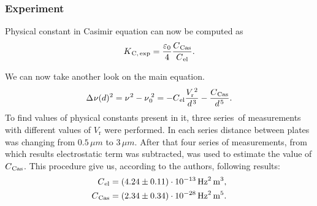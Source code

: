 \documentclass[10pt,t]{beamer}
\begin{document}
\begin{frame}
  \frametitle{Experiment}


  Physical constant in Casimir equation can now be computed as
  \begin{equation}
    \label{eq:G-Bressi-et-al-ETC-04}
    K_{ \HorSpaceTwo \text{C}, \, \text{exp} } =
    \frac{ \varepsilon_{ 0 } }{ 4 } \frac{ C_{ \HorSpaceTwo \text{Cas} } }{
      C_{ \HorSpaceTwo \text{el} } }.
  \end{equation}

  \vspace{-1em}



  We can now take another look on the main equation.
  \begin{equation}
    \label{eq:G-Bressi-et-al-ETC-05}
    \Delta \HorSpaceOne \nu( d )^{ 2 } =
    \nu^{ \HorSpaceOne 2 } - \nu_{ \HorSpaceTwo 0 }^{ \; 2 } =
    -C_{ \HorSpaceTwo \text{el} } \frac{ V_{ \text{r} }^{ \, 2 } }{
      d^{ \HorSpaceThree 3 } } -
    \frac{ C_{ \HorSpaceTwo \text{Cas} } }{ d^{ \HorSpaceFour 5 } }.
  \end{equation}
  To find values of physical constants present in it, three series~of
  measurements with different values of $V_{ \text{r} }$ were performed.
  In each series distance between plates was changing from
  $0.5 \, \mu\si{m}$ to $3 \, \mu\si{m}$. After that four series of
  measurements, from which results electrostatic term was subtracted, was
  used to estimate the value of $C_{ \hspace{0.07em} \text{Cas} }$. This procedure
  give us, according to the authors, following results:
  \begin{align}
    \label{eq:G-Bressi-et-al-ETC-06-A}
    C_{ \HorSpaceTwo \text{el} }
    &=
      ( 4.24 \pm 0.11 ) \cdot 10^{ -13 } \, \si{Hz}^{ 2 } \, \si{m}^{ 3 }, \\
    \label{eq:G-Bressi-et-al-ETC-06-B}
    C_{ \HorSpaceTwo \text{Cas} }
    &=
      ( 2.34 \pm 0.34 ) \cdot 10^{ -28 } \, \si{Hz}^{ 2 } \, \si{m}^{ 5 }.
    \end{align}

\end{frame}
\end{document}
